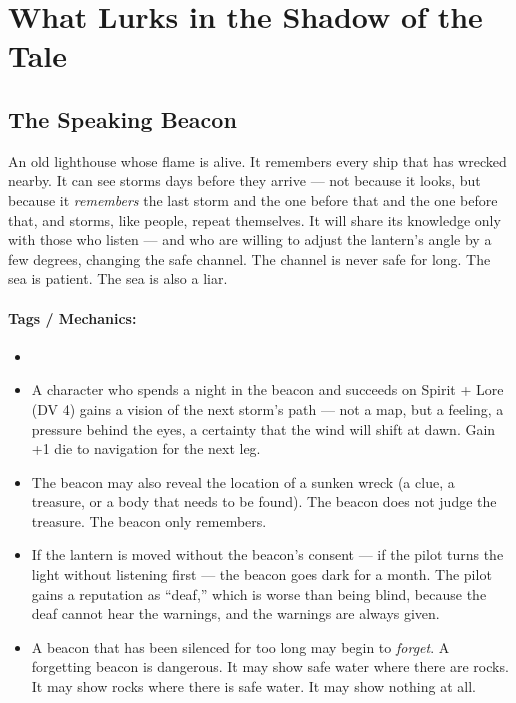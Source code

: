 \section*{What Lurks in the Shadow of the Tale}

\subsection*{The Speaking Beacon}

An old lighthouse whose flame is alive. It remembers every ship that has wrecked nearby. It can see storms days before they arrive --- not because it looks, but because it \textit{remembers} the last storm and the one before that and the one before that, and storms, like people, repeat themselves. It will share its knowledge only with those who listen --- and who are willing to adjust the lantern's angle by a few degrees, changing the safe channel. The channel is never safe for long. The sea is patient. The sea is also a liar.

\paragraph{Tags / Mechanics:}
\begin{itemize}
\item [KNOWLEDGE] [LOCATION] [TRUTH]
\item A character who spends a night in the beacon and succeeds on Spirit + Lore (DV 4) gains a vision of the next storm's path --- not a map, but a feeling, a pressure behind the eyes, a certainty that the wind will shift at dawn. Gain +1 die to navigation for the next leg.
\item The beacon may also reveal the location of a sunken wreck (a clue, a treasure, or a body that needs to be found). The beacon does not judge the treasure. The beacon only remembers.
\item If the lantern is moved without the beacon's consent --- if the pilot turns the light without listening first --- the beacon goes dark for a month. The pilot gains a reputation as ``deaf,'' which is worse than being blind, because the deaf cannot hear the warnings, and the warnings are always given.
\item A beacon that has been silenced for too long may begin to \textit{forget}. A forgetting beacon is dangerous. It may show safe water where there are rocks. It may show rocks where there is safe water. It may show nothing at all.
\end{itemize}

